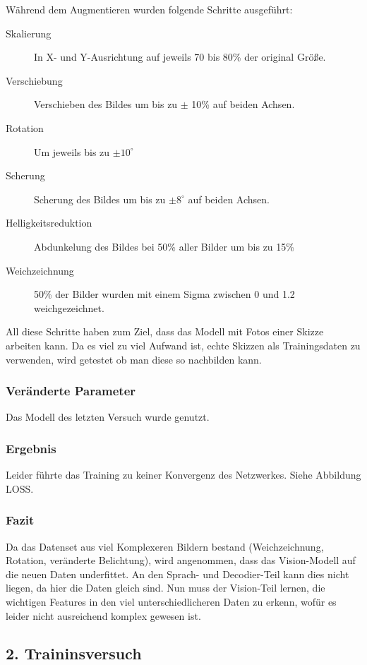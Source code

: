 \documentclass[pdftex,a4paper,halfparskip, article]{scrartcl}
\begin{document}
Während dem Augmentieren wurden folgende Schritte ausgeführt: 
\begin{description}
	\item[Skalierung] In X- und Y-Ausrichtung auf jeweils 70 bis 80\% der original Größe.
	\item[Verschiebung] Verschieben des Bildes um bis zu $\pm$ 10\% auf beiden Achsen.
	\item[Rotation] Um jeweils bis zu $\pm 10^\circ$
	\item[Scherung]  Scherung des Bildes um bis zu $\pm 8^\circ$ auf beiden Achsen.
	\item[Helligkeitsreduktion] Abdunkelung des Bildes bei 50\% aller Bilder um bis zu 15\%
	\item[Weichzeichnung] 50\% der Bilder wurden mit einem Sigma zwischen 0 und 1.2 weichgezeichnet.
\end{description}

All diese Schritte haben zum Ziel, dass das Modell mit Fotos einer Skizze arbeiten kann. Da es viel zu viel Aufwand ist, echte Skizzen als Trainingsdaten zu verwenden, wird getestet ob man diese so nachbilden kann.

\subsubsection*{Veränderte Parameter}

Das Modell des letzten Versuch wurde genutzt.
                 
\subsubsection*{Ergebnis}
   
Leider führte das Training zu keiner Konvergenz des Netzwerkes.
Siehe Abbildung LOSS.

\subsubsection*{Fazit}

Da das Datenset aus viel Komplexeren Bildern bestand (Weichzeichnung, Rotation, veränderte Belichtung), wird angenommen, dass das Vision-Modell auf die neuen Daten underfittet. An den Sprach- und Decodier-Teil kann dies nicht liegen, da hier die Daten gleich sind. Nun muss der Vision-Teil lernen, die wichtigen Features in den viel unterschiedlicheren Daten zu erkenn, wofür es leider nicht ausreichend komplex gewesen ist.

\subsection{2. Traininsversuch}
\end{document}
